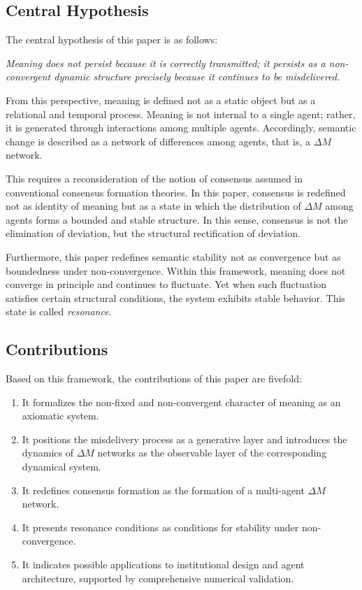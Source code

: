 \documentclass[11pt,a4paper]{article}
\theoremstyle{definition}
\begin{document}
\subsection{Central Hypothesis}

The central hypothesis of this paper is as follows:

\textit{Meaning does not persist because it is correctly transmitted; it persists as a non-convergent dynamic structure precisely because it continues to be misdelivered.}

From this perspective, meaning is defined not as a static object but as a relational and temporal process. Meaning is not internal to a single agent; rather, it is generated through interactions among multiple agents. Accordingly, semantic change is described as a network of differences among agents, that is, a $\Delta M$ network.

This requires a reconsideration of the notion of consensus assumed in conventional consensus formation theories. In this paper, consensus is redefined not as identity of meaning but as a state in which the distribution of $\Delta M$ among agents forms a bounded and stable structure. In this sense, consensus is not the elimination of deviation, but the structural rectification of deviation.

Furthermore, this paper redefines semantic stability not as convergence but as boundedness under non-convergence. Within this framework, meaning does not converge in principle and continues to fluctuate. Yet when such fluctuation satisfies certain structural conditions, the system exhibits stable behavior. This state is called \textit{resonance}.

\subsection{Contributions}

Based on this framework, the contributions of this paper are fivefold:

\begin{enumerate}
\item It formalizes the non-fixed and non-convergent character of meaning as an axiomatic system.
\item It positions the misdelivery process as a generative layer and introduces the dynamics of $\Delta M$ networks as the observable layer of the corresponding dynamical system.
\item It redefines consensus formation as the formation of a multi-agent $\Delta M$ network.
\item It presents resonance conditions as conditions for stability under non-convergence.
\item It indicates possible applications to institutional design and agent architecture, supported by comprehensive numerical validation.
\end{enumerate}
\end{document}
